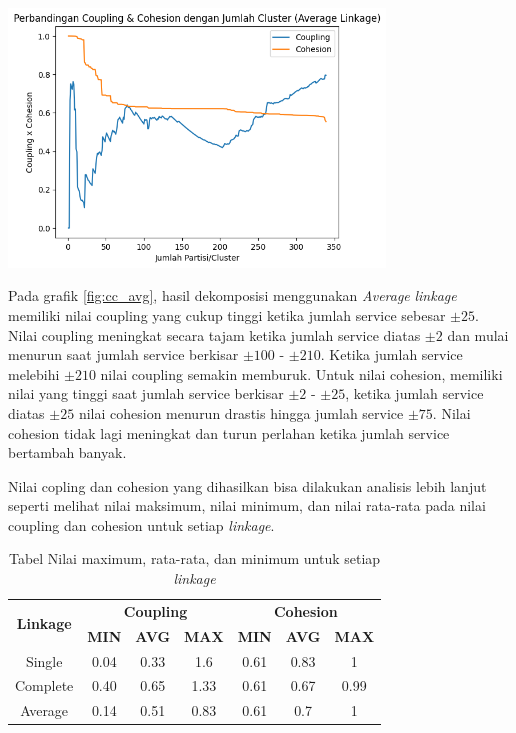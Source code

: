 \begin{center}
	\includegraphics[width=10cm]{img/bab_4/cc_avg.png}
	\label{fig:cc_avg}
\end{center}

Pada grafik \ref{fig:cc_avg}, hasil dekomposisi menggunakan \textit{Average} \textit{linkage} memiliki nilai coupling yang cukup tinggi ketika jumlah service sebesar  $\pm 25$. Nilai coupling meningkat secara tajam ketika jumlah service diatas  $\pm 2$ dan mulai menurun saat jumlah service berkisar  $\pm 100$ - $\pm 210$. Ketika jumlah service melebihi  $\pm 210$ nilai coupling semakin memburuk. Untuk nilai cohesion, memiliki nilai yang tinggi saat jumlah service berkisar  $\pm 2$ -  $\pm 25$, ketika jumlah service diatas  $\pm 25$ nilai cohesion menurun drastis hingga jumlah service  $\pm 75$. Nilai cohesion tidak lagi meningkat dan turun perlahan ketika jumlah service bertambah banyak.

Nilai copling dan cohesion yang dihasilkan bisa dilakukan analisis lebih lanjut seperti melihat nilai maksimum, nilai minimum, dan nilai rata-rata pada nilai coupling dan cohesion untuk setiap \textit{linkage}.

\begin{table}[ht]
\centering
\begin{tabular}{|c|c|c|c|c|c|c|}
\hline
\multirow{2}{*}{\textbf{Linkage}} & \multicolumn{3}{c|}{\textbf{Coupling}} & \multicolumn{3}{c|}{\textbf{Cohesion}} \\
\cline{2-7}
&  \textbf{MIN} & \textbf{AVG} &  \textbf{MAX} &  \textbf{MIN} &  \textbf{AVG} & \textbf{MAX} \\
\hline
Single & 0.04 & 0.33 & 1.6    & 0.61 & 0.83 & 1 \\
Complete & 0.40 & 0.65 & 1.33 & 0.61 & 0.67 & 0.99 \\
Average & 0.14 & 0.51 & 0.83  & 0.61 & 0.7  & 1 \\
\hline
\end{tabular}
\caption{Tabel  Nilai maximum, rata-rata, dan minimum untuk setiap \textit{linkage}}
\label{tab:link_stat}
\end{table}

